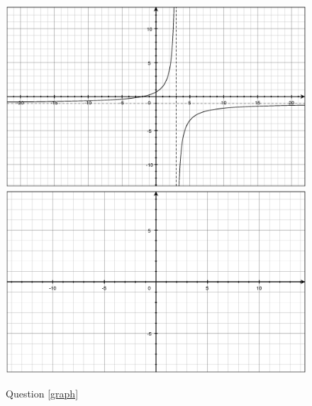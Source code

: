 \documentclass[fleqn,addpoints]{exam}
\begin{document}
\begin{questions}
\begin{figure}[H]
  \centering
\ifprintanswers
  \includegraphics[scale=.6]{graph.eps}
\else
  \includegraphics[scale=.6]{empty_grid.eps}
\fi
  \caption*{Question \ref{graph}}
\end{figure}








\end{questions}
\end{document}
